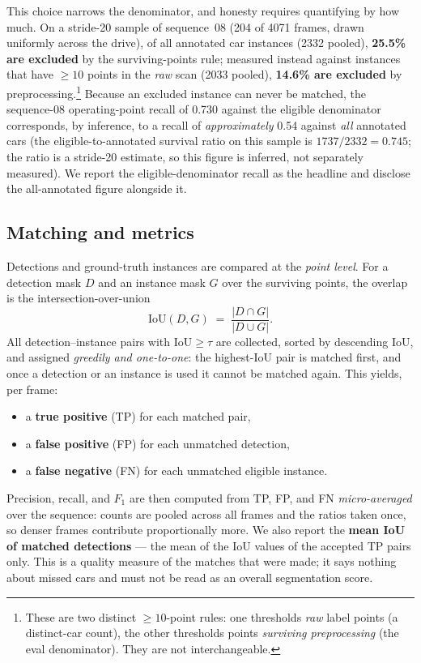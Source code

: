 This choice narrows the denominator, and honesty requires quantifying by how
much. On a stride-20 sample of sequence~08 (204 of \num{4071} frames, drawn
uniformly across the drive), of all annotated car instances
(\num{2332} pooled), \textbf{25.5\% are excluded} by the surviving-points rule;
measured instead against instances that have $\geq 10$ points in the \emph{raw}
scan (\num{2033} pooled), \textbf{14.6\% are excluded} by preprocessing.\footnote{%
These are two distinct $\geq 10$-point rules: one thresholds \emph{raw} label
points (a distinct-car count), the other thresholds points \emph{surviving
preprocessing} (the eval denominator). They are not interchangeable.}
Because an excluded instance can never be matched, the sequence-08 operating-point
recall of \num{0.730} against the eligible denominator corresponds, by inference, to a
recall of \emph{approximately} \num{0.54} against \emph{all} annotated cars
(the eligible-to-annotated survival ratio on this sample is
$\num{1737}/\num{2332}=\num{0.745}$; the ratio is a stride-20 estimate, so this
figure is inferred, not separately measured). We report the eligible-denominator
recall as the headline and disclose the all-annotated figure alongside it.

\subsection{Matching and metrics}
\label{sec:eval-matching}

Detections and ground-truth instances are compared at the \emph{point level}.
For a detection mask $D$ and an instance mask $G$ over the surviving points, the
overlap is the intersection-over-union
\[
  \mathrm{IoU}(D,G) \;=\; \frac{|D \cap G|}{|D \cup G|}.
\]
All detection--instance pairs with $\mathrm{IoU} \geq \tau$ are collected, sorted
by descending IoU, and assigned \emph{greedily and one-to-one}: the highest-IoU
pair is matched first, and once a detection or an instance is used it cannot be
matched again. This yields, per frame:
\begin{itemize}
  \item a \textbf{true positive} (TP) for each matched pair,
  \item a \textbf{false positive} (FP) for each unmatched detection,
  \item a \textbf{false negative} (FN) for each unmatched eligible instance.
\end{itemize}
Precision, recall, and $F_1$ are then computed from TP, FP, and FN
\emph{micro-averaged} over the sequence: counts are pooled across all frames and
the ratios taken once, so denser frames contribute proportionally more. We also
report the \textbf{mean IoU of matched detections} --- the mean of the IoU values
of the accepted TP pairs only. This is a quality measure of the matches that were
made; it says nothing about missed cars and must not be read as an overall
segmentation score.

